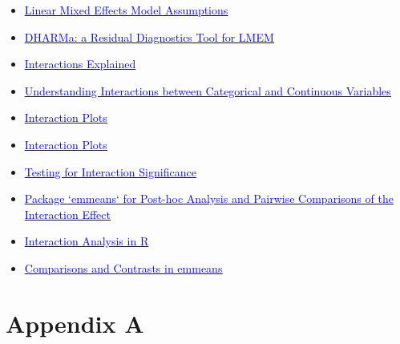 \documentclass[
]{article}
\providecommand{\tightlist}{%
  \setlength{\itemsep}{0pt}\setlength{\parskip}{0pt}}
\begin{document}
\begin{itemize}
  \begin{itemize}
  \tightlist
  \item
    \href{https://besjournals.onlinelibrary.wiley.com/doi/10.1111/2041-210X.13434}{\underline{\textcolor{blue}{Linear Mixed Effects Model Assumptions}}}
  \item
    \href{https://cran.r-project.org/web/packages/DHARMa/vignettes/DHARMa.html}{\underline{\textcolor{blue}{DHARMa: a Residual Diagnostics Tool for LMEM}}}
  \item
    \href{www.medicine.mcgill.ca/epidemiology/Joseph/courses/EPIB-621/interaction.pdf}{\underline{\textcolor{blue}{Interactions Explained}}}
  \item
    \href{https://www.theanalysisfactor.com/interactions-categorical-and-continuous-variables/}{\underline{\textcolor{blue}{Understanding Interactions between Categorical and Continuous Variables}}}
  \item
    \href{https://ademos.people.uic.edu/Chapter13.html}{\underline{\textcolor{blue}{Interaction Plots}}}
  \item
    \href{https://rpubs.com/tf_peterson/interactionplotDemo}{\underline{\textcolor{blue}{Interaction Plots}}}
  \item
    \href{https://mcfromnz.wordpress.com/2011/03/02/anova-type-iiiiii-ss-explained/}{\underline{\textcolor{blue}{Testing for Interaction Significance}}}
  \item
    \href{https://cran.r-project.org/web/packages/emmeans/vignettes/interactions.html}{\underline{\textcolor{blue}{Package `emmeans` for Post-hoc Analysis and Pairwise Comparisons of the Interaction Effect}}}
  \item
    \href{https://stats.oarc.ucla.edu/r/seminars/interactions-r/}{\underline{\textcolor{blue}{Interaction Analysis in R}}}
  \item
    \href{https://cran.r-project.org/web/packages/emmeans/vignettes/comparisons.html}{\underline{\textcolor{blue}{Comparisons and Contrasts in emmeans}}}
  \end{itemize}
\end{itemize}

\pagebreak

\hypertarget{appendix-appendix}{%
\appendix}


\hypertarget{appendix-a}{%
\section{Appendix A}\label{appendix-a}}
\end{document}
